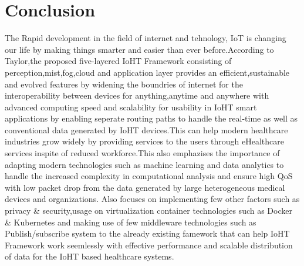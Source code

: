 \newpage
\section{Conclusion}
The Rapid development in the field of internet and tehnology, IoT is changing our life by making things smarter and easier than ever before.According to Taylor\cite{3},the proposed five-layered IoHT Framework consisting of perception,mist,fog,cloud and application layer provides an efficient,sustainable and evolved features by widening the boundries of internet for the interoperability between devices for anything,anytime and anywhere with advanced computing speed and scalability for usability in IoHT smart applications by enabling seperate routing paths to handle the real-time as well as conventional data generated by IoHT devices.This can help modern healthcare industries grow widely by providing services to the users through eHealthcare services inspite of reduced workforce.This also emphazises the importance of adapting modern technologies such as machine learning and data analytics to handle the increased complexity in computational analysis and ensure high QoS with low packet drop from the data generated by large heterogeneous medical devices and organizations. Also focuses on implementing few other factors such as privacy \& security,usage on virtualization container technologies such as Docker \& Kubernetes and making use of few middleware technologies such as Publish/subscribe system to the already existing famework that can help IoHT Framework work seemlessly with effective performance and scalable distribution of data for the IoHT based healthcare systems.